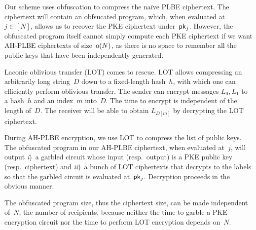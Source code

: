 Our scheme uses obfuscation to compress the na{\"i}ve PLBE ciphertext.
The ciphertext will contain an obfsucated program, which, when evaluated at~${j\in[N]}$, allows us to recover the PKE ciphertext under~$\pk_j$.
However, the obfuscated program itself cannot simply compute each PKE ciphertext if we want AH-PLBE ciphertexts of size~$\operatorname{o}(N)$, as there is no space to remember all the public keys that have been independently generated.

Laconic oblivious transfer (LOT) comes to rescue.
LOT allows compressing an arbitrarily long string~$D$ down to a fixed-length hash~$h$, with which one can efficiently perform oblivious transfer.
The sender can encrypt messages $L_0,L_1$ to a hash~$h$ and an index~$m$ into~$D$.
The time to encrypt is independent of the length of~$D$.
The receiver will be able to obtain $L_{D[m]}$ by decrypting the LOT ciphertext.

During AH-PLBE encryption, we use LOT to compress the list of public keys.
The obfuscated program in our AH-PLBE ciphertext, when evaluated at~$j$, will output
\emph{i})~a garbled circuit whose input (resp.~output) is a PKE public key (resp.~ciphertext) and
\emph{ii})~a bunch of LOT ciphertexts that decrypts to the labels so that the garbled circuit is evaluated at~$\pk_j$.
Decryption proceeds in the obvious manner.

The obfuscated program size, thus the ciphertext size, can be made independent of~$N$, the number of recipients, because
neither the time to garble a PKE encryption circuit nor the time to perform LOT encryption depends on~$N$.
